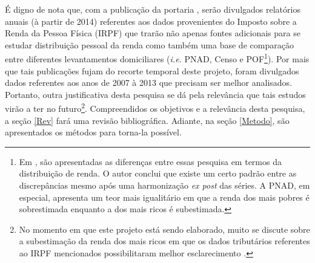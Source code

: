É digno de nota que, com a publicação da portaria ,
serão divulgados relatórios anuais (à partir de 2014) referentes aos dados provenientes do Imposto sobre a Renda da Pessoa Física (IRPF) que trarão não apenas fontes adicionais para se estudar distribuição pessoal da renda como também uma base de comparação entre diferentes levantamentos domiciliares (\textit{i.e.} PNAD, Censo e POF\footnote{Em \textcite{souza_distribuicao_2015}, são apresentadas as diferenças entre essas pesquisa em termos da distribuição de renda. O autor conclui que existe um certo padrão entre as discrepâncias mesmo após uma harmonização \textit{ex post} das séries. A PNAD, em especial, apresenta um teor mais igualitário em que a renda dos mais pobres é sobrestimada enquanto a dos mais ricos é subestimada.}). Por mais que tais publicações fujam do recorte temporal deste projeto, foram divulgados dados referentes aos anos de 2007 à 2013 que precisam ser melhor analisados.
Portanto, outra justificativa desta pesquisa se dá pela relevância que tais estudos virão a ter no futuro\footnote{No momento em que este projeto está sendo elaborado, muito se discute sobre a subestimação da renda dos mais ricos em que os dados tributários referentes ao IRPF mencionados possibilitaram melhor esclarecimento \cites{afonso_irpf_2014}{medeiros_upper_2015}.}. 
Compreendidos os objetivos e a relevância desta pesquisa, a seção \ref{Rev} fará uma revisão bibliográfica. Adiante, na seção \ref{Metodo}, são apresentados os métodos para torna-la possível.

\begin{comment}
Deste episódio como um todo, verificou-se um 


Além disso, é importante frisar que este 
\end{comment}




